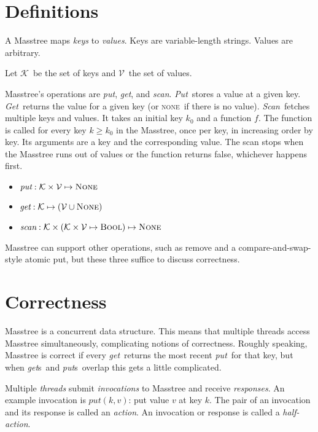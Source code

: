 \documentclass[11pt]{article}
\newcommand{\Keyset}{\ensuremath{\mathcal K}}
\newcommand{\Valueset}{\ensuremath{\mathcal V}}
\newcommand{\None}{\textsc{None}}
\newcommand{\NONE}{\textsc{none}}
\newcommand{\Bool}{\textsc{Bool}}
\newcommand{\sysGet}{\textit{Get}}
\newcommand{\sysget}{\textit{get}}
\newcommand{\sysgets}{\textit{get\/}s}
\newcommand{\sysPut}{\textit{Put}}
\newcommand{\sysput}{\textit{put}}
\newcommand{\sysputs}{\textit{put\/}s}
\newcommand{\sysScan}{\textit{Scan}}
\newcommand{\sysscan}{\textit{scan}}
\begin{document}
\section{Definitions}

A Masstree maps \emph{keys} to \emph{values}. Keys are variable-length strings. Values are arbitrary.

Let \Keyset\ be the set of keys and \Valueset\ the set of values.

Masstree's operations are \sysput, \sysget, and \sysscan. \sysPut\ stores a value at a given key. \sysGet\ returns the value for a given key (or \NONE\ if there is no value). \sysScan\ fetches multiple keys and values. It takes an initial key $k_0$ and a function $f$. The function is called for every key $k \geq k_0$ in the Masstree, once per key, in increasing order by key. Its arguments are a key and the corresponding value. The scan stops when the Masstree runs out of values or the function returns false, whichever happens first.

\begin{itemize}
\item \(\sysput : \Keyset \times \Valueset \mapsto \None\)
\item \(\sysget : \Keyset \mapsto (\Valueset \cup \None)\)
\item \(\sysscan : \Keyset \times (\Keyset \times \Valueset \mapsto \Bool) \mapsto \None\)
\end{itemize}

Masstree can support other operations, such as remove and a compare-and-swap-style atomic put, but these three suffice to discuss correctness.


\section{Correctness}

Masstree is a concurrent data structure. This means that multiple threads access Masstree simultaneously, complicating notions of correctness. Roughly speaking, Masstree is correct if every \sysget\ returns the most recent \sysput\ for that key, but when \sysgets\ and \sysputs\ overlap this gets a little complicated.

Multiple \emph{threads} submit \emph{invocations} to Masstree and
receive \emph{responses}. An example invocation is \(\sysput(k,v)\): put
value $v$ at key $k$. The pair of an invocation and its response is
called an \emph{action}. An invocation or response is
called a \emph{half-action}.
\end{document}
